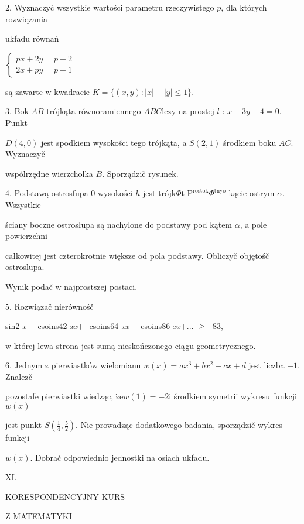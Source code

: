 \documentclass[a4paper,12pt]{article}
\begin{document}
2. Wyznaczyč wszystkie wartości parametru rzeczywistego $p$, dla których rozwiqzania

ukfadu równań

$\left\{\begin{array}{l}
px+2y=p- 2\\
2x+py=p-1
\end{array}\right.$

są zawarte $\mathrm{w}$ kwadracie $K=\{(x,y):|x|+|y|\leq 1\}.$

3. Bok $AB$ trójkąta równoramiennego $ABC\mathrm{l}\mathrm{e}\dot{\mathrm{z}}\mathrm{y}$ na prostej $l$ : $x-3y-4 = 0$. Punkt

$D(4,0)$ jest spodkiem wysokości tego trójkąta, a $S(2,1)$ środkiem boku $AC$. Wyznaczyč

wspólrzędne wierzcholka $B$. Sporządzič rysunek.

4. Podstawą ostrosfupa $0$ wysokości $h$ jest trójk$\Phi$t $\mathrm{P}^{\mathrm{r}\mathrm{o}\mathrm{s}\mathrm{t}\mathrm{o}\mathrm{k}}\Phi^{\mathrm{t}\mathrm{n}\mathrm{y}\mathrm{o}}$ kącie ostrym $\alpha$. Wszystkie

ściany boczne ostrosłupa są nachylone do podstawy pod kątem $\alpha$, a pole powierzchni

całkowitej jest czterokrotnie większe od pola podstawy. Obliczyč objętośč ostroslupa.

Wynik podač $\mathrm{w}$ najprostszej postaci.

5. Rozwiązač nierównośč

sin2 {\it x}$+$ -csoins42 {\it xx}$+$ -csoins64 {\it xx}$+$ -csoins86 {\it xx}$+$... $\geq$ -83,

$\mathrm{w}$ której lewa strona jest sumą nieskończonego ciągu geometrycznego.

6. Jednym $\mathrm{z}$ pierwiastków wielomianu $w(x)=ax^{3}+bx^{2}+cx+d$ jest liczba $-1$. Znalez$\acute{}$č

pozostafe pierwiastki wiedząc, $\dot{\mathrm{z}}\mathrm{e}w(1)=-2\mathrm{i}$ środkiem symetrii wykresu funkcji $w(x)$

jest punkt $S(\displaystyle \frac{1}{4},\frac{5}{2})$. Nie prowadząc dodatkowego badania, sporządzič wykres funkcji

$w(x)$. Dobrač odpowiednio jednostki na osiach ukfadu.





XL

KORESPONDENCYJNY KURS

Z MATEMATYKI
\end{document}
